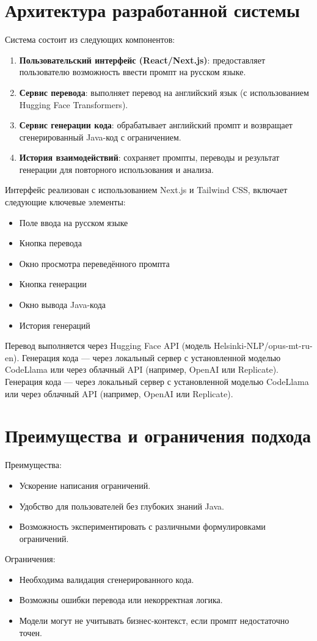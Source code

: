 \section{Архитектура разработанной системы}

Система состоит из следующих компонентов:

\begin{enumerate}
    \item \textbf{Пользовательский интерфейс (React/Next.js)}: предоставляет пользователю возможность ввести промпт на русском языке.
    \item \textbf{Сервис перевода}: выполняет перевод на английский язык (с использованием Hugging Face Transformers).
    \item \textbf{Сервис генерации кода}: обрабатывает английский промпт и возвращает сгенерированный Java-код с ограничением.
    \item \textbf{История взаимодействий}: сохраняет промпты, переводы и результат генерации для повторного использования и анализа.
\end{enumerate}

Интерфейс реализован с использованием Next.js и Tailwind CSS, включает следующие ключевые элементы:

\begin{itemize}
    \item Поле ввода на русском языке
    \item Кнопка перевода
    \item Окно просмотра переведённого промпта
    \item Кнопка генерации
    \item Окно вывода Java-кода
    \item История генераций
\end{itemize}

Перевод выполняется через Hugging Face API (модель Helsinki-NLP/opus-mt-ru-en). Генерация кода — через локальный сервер с установленной моделью CodeLlama или через облачный API (например, OpenAI или Replicate). Генерация кода — через локальный сервер с установленной моделью CodeLlama или через облачный API (например, OpenAI или Replicate).

\section{ Преимущества и ограничения подхода}

Преимущества:

\begin{itemize}
    \item Ускорение написания ограничений.
    \item Удобство для пользователей без глубоких знаний Java.
    \item Возможность экспериментировать с различными формулировками ограничений.
\end{itemize}

Ограничения:

\begin{itemize}
    \item Необходима валидация сгенерированного кода.
    \item Возможны ошибки перевода или некорректная логика.
    \item Модели могут не учитывать бизнес-контекст, если промпт недостаточно точен.
\end{itemize}